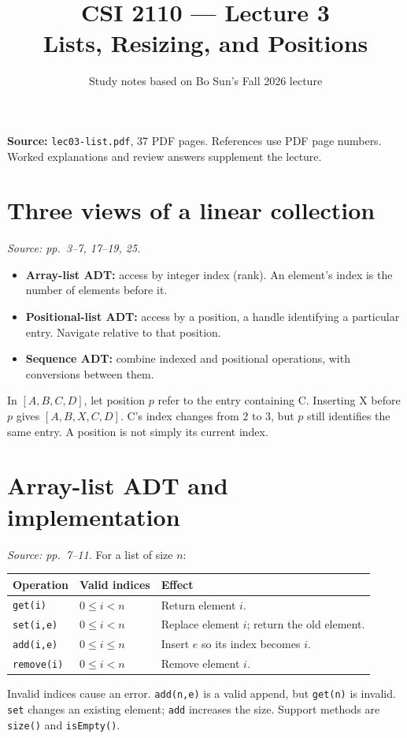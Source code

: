 \documentclass[11pt]{article}
\title{CSI 2110 --- Lecture 3\\Lists, Resizing, and Positions}
\author{Study notes based on Bo Sun's Fall 2026 lecture}
\date{}
\begin{document}
\maketitle
\textbf{Source:} \texttt{lec03-list.pdf}, 37 PDF pages. References use PDF page numbers. Worked explanations and review answers supplement the lecture.

\section{Three views of a linear collection}
\textit{Source: pp.\ 3--7, 17--19, 25.}
\begin{itemize}
\item \textbf{Array-list ADT:} access by integer index (rank). An element's index is the number of elements before it.
\item \textbf{Positional-list ADT:} access by a position, a handle identifying a particular entry. Navigate relative to that position.
\item \textbf{Sequence ADT:} combine indexed and positional operations, with conversions between them.
\end{itemize}
In $[A,B,C,D]$, let position $p$ refer to the entry containing C. Inserting X before $p$ gives $[A,B,X,C,D]$. C's index changes from $2$ to $3$, but $p$ still identifies the same entry. A position is not simply its current index.

\section{Array-list ADT and implementation}
\textit{Source: pp.\ 7--11.}
For a list of size $n$:
\begin{center}
\begin{tabularx}{\textwidth}{llX}
\toprule
Operation & Valid indices & Effect\\
\midrule
\texttt{get(i)} & $0\le i<n$ & Return element $i$.\\
\texttt{set(i,e)} & $0\le i<n$ & Replace element $i$; return the old element.\\
\texttt{add(i,e)} & $0\le i\le n$ & Insert $e$ so its index becomes $i$.\\
\texttt{remove(i)} & $0\le i<n$ & Remove element $i$.\\
\bottomrule
\end{tabularx}
\end{center}
Invalid indices cause an error. \texttt{add(n,e)} is a valid append, but \texttt{get(n)} is invalid. \texttt{set} changes an existing element; \texttt{add} increases the size. Support methods are \texttt{size()} and \texttt{isEmpty()}.
\end{document}
